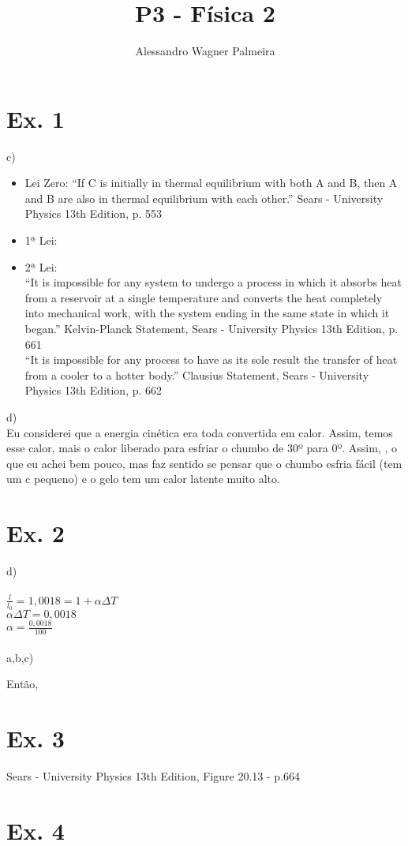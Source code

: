 
\title{P3 - Física 2}
\author{Alessandro Wagner Palmeira}

\maketitle

\section{Ex. 1}
c)
\begin{itemize}
  \item Lei Zero: ``If C is initially in thermal equilibrium with both A and B, then A and B are also
in thermal equilibrium with each other.'' Sears - University Physics 13th Edition, p. 553

  \item 1ª Lei: 
  \item 2ª Lei:\\
``It is impossible for any system to undergo a process in which it absorbs heat
from a reservoir at a single temperature and converts the heat completely into
mechanical work, with the system ending in the same state in which it began.'' Kelvin-Planck Statement, Sears - University Physics 13th Edition, p. 661 \\
``It is impossible for any process to have as its sole result the transfer of heat from
a cooler to a hotter body.'' Clausius Statement, Sears - University Physics 13th Edition, p. 662
\end{itemize}
d) \\
Eu considerei que a energia cinética era toda convertida em calor. Assim, temos esse calor, mais o calor liberado para esfriar o chumbo de 30º para 0º.
Assim, , o que eu achei bem pouco, mas faz sentido se pensar que o chumbo esfria fácil (tem um c pequeno) e o gelo tem um calor latente muito alto.

\section{Ex. 2}
d)\\
 \\
$\frac{l}{l_{0}} = 1,0018 = 1 + \alpha \Delta T$\\
$\alpha \Delta T = 0,0018$\\
$\alpha = \frac{0,0018}{100}$\\
\\
a,b,c)

Então,\\

\section{Ex. 3}
Sears - University Physics 13th Edition, Figure 20.13 - p.664

\section{Ex. 4}


